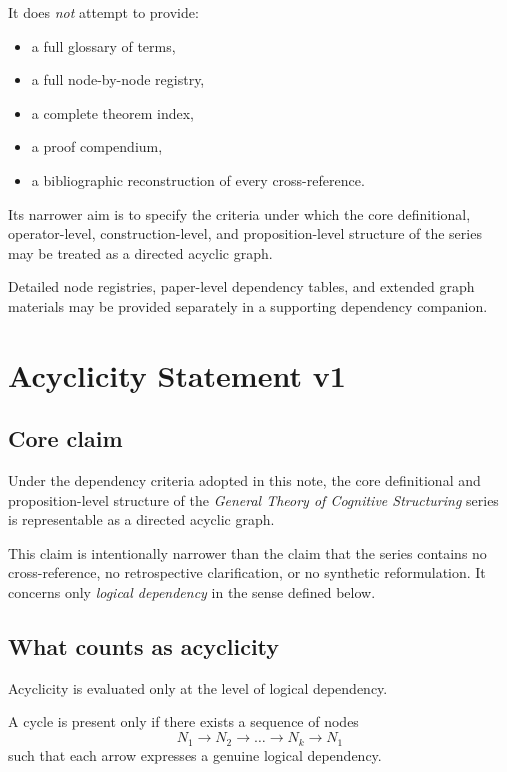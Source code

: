\documentclass[11pt,a4paper]{article}
\begin{document}
	It does \emph{not} attempt to provide:
	\begin{itemize}[leftmargin=2em]
		\item a full glossary of terms,
		\item a full node-by-node registry,
		\item a complete theorem index,
		\item a proof compendium,
		\item a bibliographic reconstruction of every cross-reference.
	\end{itemize}
	
	Its narrower aim is to specify the criteria under which the core definitional, operator-level,
	construction-level, and proposition-level structure of the series may be treated as a directed
	acyclic graph.
	
	Detailed node registries, paper-level dependency tables, and extended graph materials may be
	provided separately in a supporting dependency companion.
	
	\section{Acyclicity Statement v1}
	
	\subsection{Core claim}
	
	Under the dependency criteria adopted in this note, the core definitional and proposition-level
	structure of the \emph{General Theory of Cognitive Structuring} series is representable as a
	directed acyclic graph.
	
	This claim is intentionally narrower than the claim that the series contains no cross-reference,
	no retrospective clarification, or no synthetic reformulation. It concerns only \emph{logical
		dependency} in the sense defined below.
	
	\subsection{What counts as acyclicity}
	
	Acyclicity is evaluated only at the level of logical dependency.
	
	A cycle is present only if there exists a sequence of nodes
	\[
	N_1 \rightarrow N_2 \rightarrow \dots \rightarrow N_k \rightarrow N_1
	\]
	such that each arrow expresses a genuine logical dependency.
	
\end{document}
